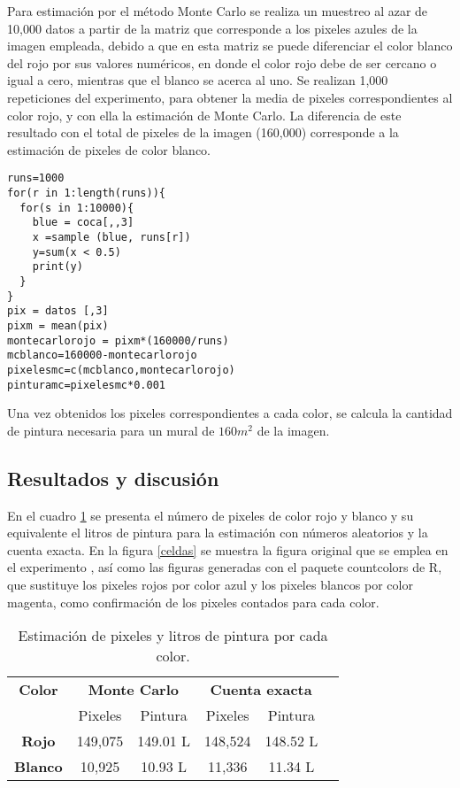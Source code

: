 \documentclass{article}
\begin{document}
Para estimación por el método Monte Carlo se realiza un muestreo al azar de 10,000 datos a partir de la matriz que corresponde a los pixeles azules de la imagen empleada, debido a que en esta matriz se puede diferenciar el color blanco del rojo por sus valores numéricos, en donde el color rojo debe de ser cercano o igual a cero, mientras que el blanco se acerca al uno. Se realizan 1,000 repeticiones del experimento, para obtener la media de pixeles correspondientes al color rojo, y con ella la estimación de Monte Carlo. La diferencia de este resultado con el total de pixeles de la imagen (160,000) corresponde a la estimación de pixeles de color blanco.
\begin{lstlisting}
runs=1000
for(r in 1:length(runs)){
  for(s in 1:10000){
    blue = coca[,,3]
    x =sample (blue, runs[r])
    y=sum(x < 0.5)
    print(y)
  }
}
pix = datos [,3]
pixm = mean(pix)
montecarlorojo = pixm*(160000/runs)
mcblanco=160000-montecarlorojo
pixelesmc=c(mcblanco,montecarlorojo)
pinturamc=pixelesmc*0.001 
\end{lstlisting}
Una vez obtenidos los pixeles correspondientes a cada color, se calcula la cantidad de pintura necesaria para un mural de $160m^{2}$ de la imagen.

\subsection{Resultados y discusión}
En el cuadro \ref{tabla} se presenta el número de pixeles de color rojo y blanco y su equivalente el litros de pintura para la estimación con números aleatorios y la cuenta exacta. En la figura \ref{celdas} se muestra la figura original que se emplea en el experimento \cite{cc}, así como las figuras generadas con el paquete countcolors de R, que sustituye los pixeles rojos por color azul y los pixeles blancos por color magenta, como confirmación de los pixeles contados para cada color.

\begin{table}[h]
\begin{center}
\caption{Estimación de pixeles y litros de pintura por cada color.}
\label{tabla}
\begin{tabular}{c c c c c c}
\hline
\textbf{Color}&\multicolumn{2}{c}{\textbf{Monte Carlo}}&\multicolumn{2}{c}{\textbf{Cuenta exacta}}\\
 &Pixeles&Pintura&Pixeles&Pintura\\
\hline
\textbf{Rojo}&149,075&149.01 L&148,524&148.52 L\\
\textbf{Blanco}&10,925&10.93 L&11,336&11.34 L\\
\hline
\end{tabular}
\end{center}
\end{table}
\end{document}
